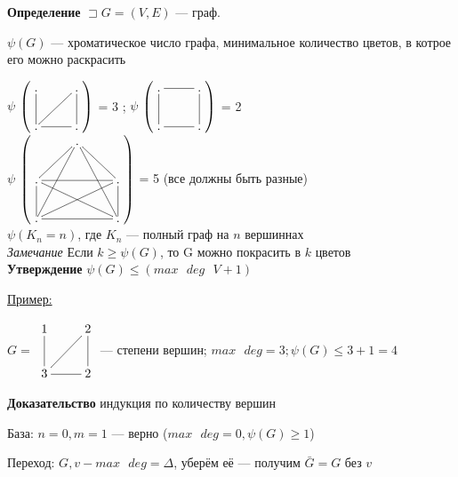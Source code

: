 \documentclass[a4paper, 12pt] {article}
\begin{document}
\newpage

\textbf{Определение} $ \sqsupset G = (V, E)$ --- граф.

$ \psi (G) $ --- хроматическое число графа, минимальное количество цветов, в котрое его можно раскрасить

$\psi $ 
$\begin{pmatrix}
 \xymatrix{
	. \ar@{-}[d]& . \ar@{-}[ld] \ar@{-}[d] \\
	.  & . \ar@{-}[l] \\
}
\end{pmatrix}
$ = 3 ; 
$\psi $ 
$\begin{pmatrix}
	\xymatrix{
		. \ar@{-}[d]& . \ar@{-}[l] \ar@{-}[d] \\
		.  & . \ar@{-}[l] \\
	}
\end{pmatrix}
$ = 2\\

$\psi $ 
$\begin{pmatrix}
	\xymatrix{
	& . \ar@{-}[ld] \ar@{-}[ldd] \ar@{-}[rd] \ar@{-}[rdd]&\\
	. \ar@{-}[d] \ar@{-}[drr] \ar@{-}[rr] & & . \ar@{-}[dll] \ar@{-}[d] \\
	.  \ar@{-}[rr] & & . \\
	}
\end{pmatrix}
$ = 5 (все должны быть разные)\\

$\psi (K_{n} = n)$, где  $K_{n}$ --- полный граф на $ n $ вершиннах\\

\textit{Замечание} Если $ k\ge \psi (G) $, то G можно покрасить в $ k $ цветов\\

\textbf{Утверждение} $ \psi (G) \le (max \text{ } deg \text{ } V +1)$

\underline{Пример:}

$G = $ 
$\begin{matrix}
	\xymatrix{
		1 \ar@{-}[d]& 2 \ar@{-}[ld] \ar@{-}[d] \\
		3  & 2 \ar@{-}[l] \\
	}
\end{matrix}
$ --- степени вершин; $ max \text{ } deg = 3;  \psi (G) \le 3+1 =4$

\textbf{Доказательство} индукция по количеству вершин

База: $ n =0, m = 1 $ --- верно ($ max \text{ } deg = 0,  \psi (G) \ge 1 $)

Переход: $ G,  v - max \text{ } deg = \Delta$, уберём её --- получим $ \bar G = G \text{ без }v $
\end{document}
